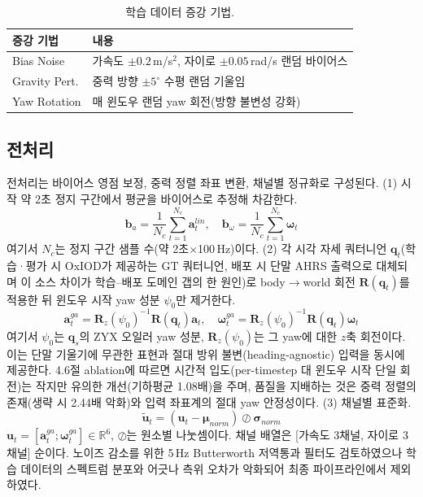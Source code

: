\documentclass{kcc}
\begin{document}
\begin{table}[!htb]
\caption{학습 데이터 증강 기법.}
\label{tab:aug}
\centering\footnotesize
\begin{tabular}{@{}p{}p{}@{}}
\toprule
증강 기법 & 내용 \\ \midrule
Bias Noise & 가속도 $\pm0.2$\,m/s$^2$, 자이로 $\pm0.05$\,rad/s 랜덤 바이어스 \\
Gravity Pert. & 중력 방향 $\pm5^\circ$ 수평 랜덤 기울임 \\
Yaw Rotation & 매 윈도우 랜덤 yaw 회전(방향 불변성 강화) \\ \bottomrule
\end{tabular}
\end{table}

\subsection{전처리}
전처리는 바이어스 영점 보정, 중력 정렬 좌표 변환, 채널별 정규화로 구성된다. (1) 시작 약 2초 정지 구간에서 평균을 바이어스로 추정해 차감한다.
\begin{equation}
\mathbf{b}_a=\frac{1}{N_c}\sum_{t=1}^{N_c}\mathbf{a}^{lin}_t,\quad
\mathbf{b}_\omega=\frac{1}{N_c}\sum_{t=1}^{N_c}\bm{\omega}_t
\end{equation}
여기서 $N_c$는 정지 구간 샘플 수(약 2초$\times$100\,Hz)이다. (2) 각 시각 자세 쿼터니언 $\mathbf{q}_t$(학습·평가 시 OxIOD가 제공하는 GT 쿼터니언, 배포 시 단말 AHRS 출력으로 대체되며 이 소스 차이가 학습--배포 도메인 갭의 한 원인)로 body$\to$world 회전 $\mathbf{R}(\mathbf{q}_t)$를 적용한 뒤 윈도우 시작 yaw 성분 $\psi_0$만 제거한다.
\begin{equation}
\mathbf{a}^{ga}_t=\mathbf{R}_z(\psi_0)^{-1}\mathbf{R}(\mathbf{q}_t)\mathbf{a}_t,\quad
\bm{\omega}^{ga}_t=\mathbf{R}_z(\psi_0)^{-1}\mathbf{R}(\mathbf{q}_t)\bm{\omega}_t
\end{equation}
여기서 $\psi_0$는 $\mathbf{q}_s$의 ZYX 오일러 yaw 성분, $\mathbf{R}_z(\psi_0)$는 그 yaw에 대한 $z$축 회전이다. 이는 단말 기울기에 무관한 표현과 절대 방위 불변(heading-agnostic) 입력을 동시에 제공한다. 4.6절 ablation에 따르면 시간적 입도(per-timestep 대 윈도우 시작 단일 회전)는 작지만 유의한 개선(기하평균 1.08배)을 주며, 품질을 지배하는 것은 중력 정렬의 존재(생략 시 2.44배 악화)와 입력 좌표계의 절대 yaw 안정성이다. (3) 채널별 표준화.
\begin{equation}
\tilde{\mathbf{u}}_t=(\mathbf{u}_t-\bm{\mu}_{norm})\oslash\bm{\sigma}_{norm}
\end{equation}
$\mathbf{u}_t=[\mathbf{a}^{ga}_t;\bm{\omega}^{ga}_t]\in\mathbb{R}^6$, $\oslash$는 원소별 나눗셈이다. 채널 배열은 [가속도 3채널, 자이로 3채널] 순이다. 노이즈 감소를 위한 5\,Hz Butterworth 저역통과 필터도 검토하였으나 학습 데이터의 스펙트럼 분포와 어긋나 측위 오차가 악화되어 최종 파이프라인에서 제외하였다.
\end{document}
